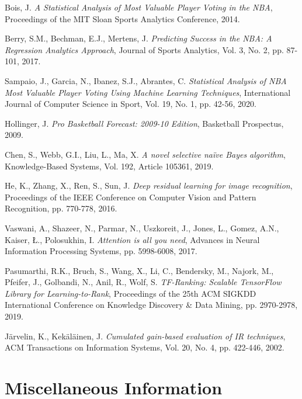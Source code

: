 \documentclass[10pt,twocolumn,letterpaper]{article}
\begin{document}
\begin{thebibliography}{9}

Bois, J.
\textit{A Statistical Analysis of Most Valuable Player Voting in the NBA},
Proceedings of the MIT Sloan Sports Analytics Conference,
2014.

Berry, S.M., Bechman, E.J., Mertens, J.
\textit{Predicting Success in the NBA: A Regression Analytics Approach},
Journal of Sports Analytics,
Vol. 3, No. 2, pp. 87-101,
2017.

Sampaio, J., Garcia, N., Ibanez, S.J., Abrantes, C.
\textit{Statistical Analysis of NBA Most Valuable Player Voting Using Machine Learning Techniques},
International Journal of Computer Science in Sport,
Vol. 19, No. 1, pp. 42-56,
2020.

Hollinger, J.
\textit{Pro Basketball Forecast: 2009-10 Edition},
Basketball Prospectus, 
2009.

Chen, S., Webb, G.I., Liu, L., Ma, X.
\textit{A novel selective naïve Bayes algorithm},
Knowledge-Based Systems,
Vol. 192, Article 105361,
2019.

He, K., Zhang, X., Ren, S., Sun, J.
\textit{Deep residual learning for image recognition},
Proceedings of the IEEE Conference on Computer Vision and Pattern Recognition,
pp. 770-778,
2016.

Vaswani, A., Shazeer, N., Parmar, N., Uszkoreit, J., Jones, L., Gomez, A.N., Kaiser, Ł., Polosukhin, I.
\textit{Attention is all you need},
Advances in Neural Information Processing Systems,
pp. 5998-6008,
2017.

Pasumarthi, R.K., Bruch, S., Wang, X., Li, C., Bendersky, M., Najork, M., Pfeifer, J., Golbandi, N., Anil, R., Wolf, S.
\textit{TF-Ranking: Scalable TensorFlow Library for Learning-to-Rank},
Proceedings of the 25th ACM SIGKDD International Conference on Knowledge Discovery \& Data Mining,
pp. 2970-2978,
2019.

Järvelin, K., Kekäläinen, J.
\textit{Cumulated gain-based evaluation of IR techniques},
ACM Transactions on Information Systems,
Vol. 20, No. 4, pp. 422-446,
2002.

\end{thebibliography}

\section{Miscellaneous Information}
\end{document}
